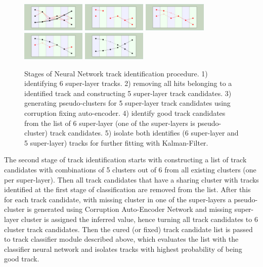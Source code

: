  \begin{figure}[!h]
\begin{center}
 \includegraphics[angle=90,width=1.2in]{images/iden_6_sl.pdf}
  \includegraphics[angle=90,width=1.2in]{images/iden_5_sl_a.pdf}
    \includegraphics[angle=90,width=1.2in]{images/iden_5_sl_b.pdf}
      \includegraphics[angle=90,width=1.2in]{images/iden_5_sl_c.pdf}
            \includegraphics[angle=90,width=1.2in]{images/iden_5_sl_d.pdf}

\caption {Stages of Neural Network track identification procedure. 1) identifying 6 super-layer tracks. 2) removing all hits 
belonging to a identified track and constructing 5 super-layer track candidates. 3) generating pseudo-clusters for 5 super-layer
track candidates using corruption fixing auto-encoder. 4) identify good track candidates from the list of 6 super-layer 
(one of the super-layers is pseudo-cluster) track candidates. 5) isolate both identifies (6 super-layer and 5 super-layer) tracks 
for further fitting with Kalman-Filter.}
 \label{network:procedure}
 \end{center}
\end{figure}

The second stage of track identification starts with constructing a list of track candidates with combinations of 5 clusters 
out of 6 from all existing clusters (one per super-layer). Then all track candidates that have a sharing cluster with tracks
identified at the first stage of classification are removed from the list. After this for each track candidate, with missing cluster
in one of the super-layers a pseudo-cluster is generated using Corruption Auto-Encoder Network and missing super-layer 
cluster is assigned the inferred value, hence turning all track candidates to 6 cluster track candidates. Then the 
cured (or fixed) track candidate list is passed to track classifier module described above, which evaluates the list with
the classifier neural network and isolates tracks with highest probability of being good track. 

